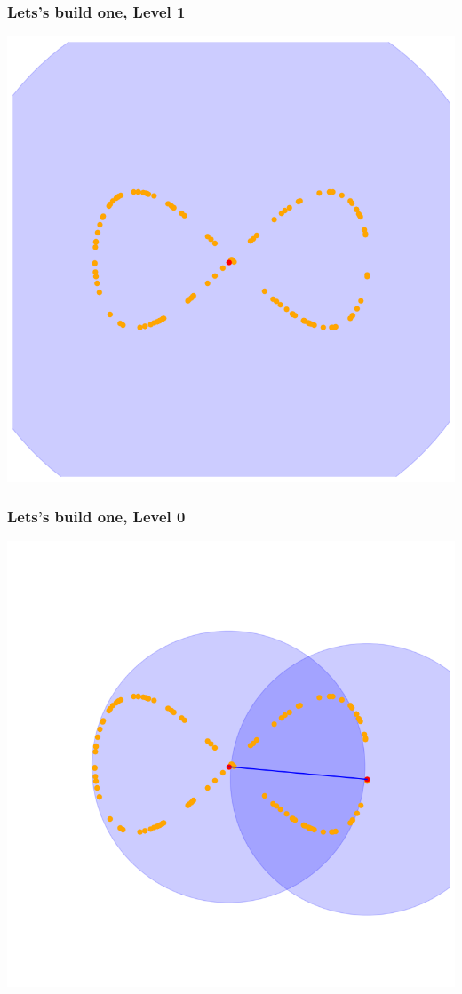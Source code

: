 \documentclass{beamer}
\begin{document}
\begin{frame}
\frametitle{Lets's build one, Level 1}
\begin{center}
    \includegraphics[scale=0.4]{2d_vis_ 1.png}
\end{center}
\end{frame}

\begin{frame}
\frametitle{Lets's build one, Level 0}
\begin{center}
    \includegraphics[scale=0.4]{2d_vis_ 0.png}
\end{center}
\end{frame}
\end{document}
